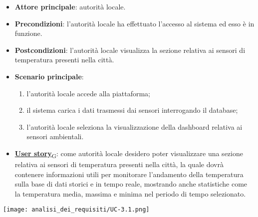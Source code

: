 \begin{itemize}
	\item \textbf{Attore principale}: autorità locale.
	\item \textbf{Precondizioni}: l'autorità locale ha effettuato l'accesso al sistema ed esso è in funzione.
	\item \textbf{Postcondizioni}: l'autorità locale visualizza la sezione relativa
	      ai sensori di temperatura presenti nella città.
	\item \textbf{Scenario principale}:
	      \begin{enumerate}
		      \item l'autorità locale accede alla piattaforma;
		      \item il sistema carica i dati trasmessi dai sensori interrogando il database;
		      \item l'autorità locale seleziona la visualizzazione della dashboard relativa ai sensori ambientali.
	      \end{enumerate}
	\item \href{https://7last.github.io/docs/pb/documentazione-interna/glossario\#user-story}{\textbf{User story}\textsubscript{G}}:
	      come autorità locale desidero poter visualizzare una sezione relativa ai sensori di temperatura presenti nella città, la quale
	      dovrà contenere informazioni utili per monitorare l'andamento della temperatura sulla base di dati storici e in tempo reale, mostrando
	      anche statistiche come la temperatura media, massima e minima nel periodo di tempo selezionato.
\end{itemize}
\begin{center}
	\texttt{[image: analisi\_dei\_requisiti/UC-3.1.png]}
\end{center}


